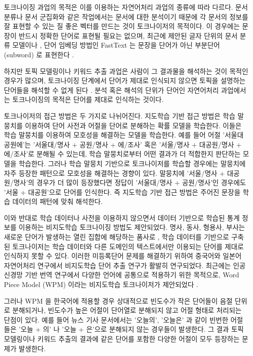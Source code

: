 \documentclass[oneside, ko,phd]{snuthesis_utf8_kor}
\begin{document}
토크나이징 과업의 목적은 이를 이용하는 자연어처리 과업의 종류에 따라 다르다.
문서 분류나 문서 군집화와 같은 작업에서는 문서에 대한 분석이기 때문에 각 문서의 정보를 잘 표현할 수 있는 질 좋은 벡터를 만드는 것이 토크나이저의 목적이다.
이 경우에는 문장이 반드시 정확한 단어로 표현될 필요는 없으며, 최근에 제안된 글자 단위의 문서 분류 모델이나 \cite{zhang2015character}, 단어 임베딩 방법인 FastText 는 문장을 단어가 아닌 부분단어 (subword) 로 표현한다 \cite{bojanowski2016enriching, joulin2016bag}.

하지만 토픽 모델링이나 키워드 추출 과업은 사람이 그 결과물을 해석하는 것이 목적인 경우가 많으며, 토크나이징 단계에서 단어가 제대로 인식되지 않으면 토픽을 설명하는 단어들을 해석할 수 없게 된다 \cite{hall2008studying}.
분석 혹은 해석의 단위가 단어인 자연어처리 과업에서는 토크나이징의 목적은 단어를 제대로 인식하는 것이다.

토크나이저의 접근 방법은 두 가지로 나뉘어진다.
지도학습 기반 접근 방법은 학습 말뭉치를 이용하여 단어 사전과 어절을 단어로 분해하는 확률 모델을 학습한다.
이들은 학습 말뭉치를 이용하여 모호성을 해결하는 모델을 학습한다.
예를 들어 어절 '서울대공원에'는 '서울대/명사 + 공원/명사 + 에/조사' 혹은 '서울/명사 + 대공원/명사 + 에/조사'로 분해될 수 있는데, 학습 말뭉치로부터 어떤 결과가 더 적합한지 판단하는 모델을 학습한다.
그러나 학습 말뭉치 기반으로 토크나이저를 학습할 경우에는 말뭉치에 자주 등장한 패턴으로 모호성을 해결하는 경향이 있다.
말뭉치에 '서울/명사 + 대공원/명사'의 경우가 더 많이 등장했다면 정답이 '서울대/명사 + 공원/명사'인 경우에도 '서울 + 대공원'으로 단어를 인식한다.
즉 지도학습 기반 접근 방법은 주어진 문장을 학습 데이터의 패턴에 맞춰 해석한다.

이와 반대로 학습 데이터나 사전을 이용하지 않으면서 데이터 기반으로 학습된 통계 정보를 이용하는 비지도학습 토크나이징 방법도 제안되었다.
명사, 동사, 형용사, 부사는 새로운 단어가 발생하는 열린 집합에 해당하는 품사로 \cite{jurafsky2000speech}, 학습 데이터를 기반으로 구축된 토크나이저는 학습 데이터와 다른 도메인의 텍스트에서만 이용되는 단어를 제대로 인식하지 못할 수 있다.
이러한 미등록단어 문제를 해결하기 위하여 중국어와 일본어 자연어처리 연구에서 비지도학습 단어 추출 연구가 활발히 연구되었다.
최근에는 인공 신경망 기반 번역 연구에서 다양한 언어에 공통으로 적용하기 위한 목적으로, Word Piece Model (WPM) 이라는 비지도학습 토크나이저가 제안되었다 \cite{sennrich2015neural}.

그러나 WPM 을 한국어에 적용할 경우 상대적으로 빈도수가 작은 단어들이 음절 단위로 분해되거나, 빈도수가 높은 어절이 단어열로 분해되지 않고 어절 형태로 처리되는 단점이 있다.
예를 들어 뉴스 기사 문서에서는 '오늘의', '오늘은' 과 같이 빈번한 어절들은 '오늘 + 의' 나 '오늘 + 은'으로 분해되지 않는 경우들이 발생한다.
그 결과 토픽 모델링이나 키워드 추출의 결과에 같은 단어를 포함한 다양한 어절이 모두 등장하는 문제가 발생한다.
\end{document}
